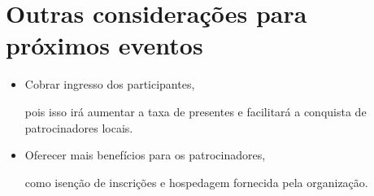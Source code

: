 \documentclass[12pt]{article}
\begin{document}
\newpage

\section*{Outras considerações para próximos eventos}

\begin{itemize}
  \item Cobrar ingresso dos participantes,

    pois isso irá aumentar a taxa de presentes e facilitará a conquista de
    patrocinadores locais.

  \item Oferecer mais benefícios para os patrocinadores,

    como isenção de inscrições e hospedagem fornecida pela organização.

\end{itemize}

\clearpage
\newpage

\thispagestyle{empty}
\phantom{1}  %
\end{document}
